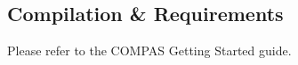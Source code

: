 \subsection{Compilation \& Requirements}\label{sec:CompilationRequirements}

Please refer to the COMPAS Getting Started guide.